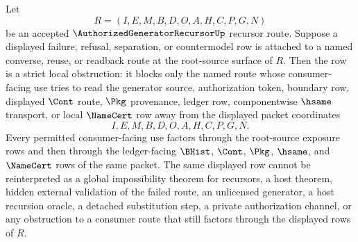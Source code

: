 \begin{corollary}
\label{cor:authorized-generator-recursor-root-source-strict-obstruction}
Let
$$
R=(I,E,M,B,D,O,A,H,C,P,G,N)
$$
be an accepted $\AuthorizedGeneratorRecursorUp$ recursor route. Suppose a displayed failure, refusal, separation, or countermodel row is attached to a named converse, reuse, or readback route at the root-source surface of $R$. Then the row is a strict local obstruction: it blocks only the named route whose consumer-facing use tries to read the generator source, authorization token, boundary row, displayed $\Cont$ route, $\Pkg$ provenance, ledger row, componentwise $\hsame$ transport, or local $\NameCert$ row away from the displayed packet coordinates
$$
I,E,M,B,D,O,A,H,C,P,G,N.
$$
Every permitted consumer-facing use factors through the root-source exposure rows and then through the ledger-facing $\BHist$, $\Cont$, $\Pkg$, $\hsame$, and $\NameCert$ rows of the same packet. The same displayed row cannot be reinterpreted as a global impossibility theorem for recursors, a host theorem, hidden external validation of the failed route, an unlicensed generator, a host recursion oracle, a detached substitution step, a private authorization channel, or any obstruction to a consumer route that still factors through the displayed rows of $R$.
\end{corollary}
